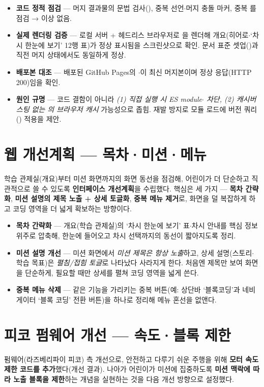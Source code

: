 \begin{itemize}
  \item \textbf{코드 정적 점검} — 머지 결과물의 문법 검사(), 중복
  선언$\cdot$머지 충돌 마커, 중복 를 점검 → 이상 없음.
  \item \textbf{실제 렌더링 검증} — 로컬 서버 + 헤드리스 브라우저로 을
  렌더해 개요(히어로$\cdot$‘차시 한눈에 보기’ 12행 표)가 정상 표시됨을 스크린샷으로 확인.
  문서 표준 셋업()과 직전 머지 상태에서도 동일하게 정상.
  \item \textbf{배포본 대조} — 배포된 GitHub Pages의 $\cdot$이
  최신 머지본이며 정상 응답(HTTP 200)임을 확인.
  \item \textbf{원인 규명} — 코드 결함이 아니라 \emph{(1)  직접 실행 시
  ES module$\cdot$ 차단, (2) 캐시버스팅 없는 의 브라우저 캐시}
  가능성으로 좁힘. 재발 방지로 모듈 로드에 버전 쿼리() 적용을 제안.
\end{itemize}

\section{웹 개선계획 — 목차·미션·메뉴}
학습 관제실(개요)부터 미션 화면까지의 화면 동선을 점검해, 어린이가 더 단순하고
직관적으로 쓸 수 있도록 \textbf{인터페이스 개선계획}을 수립했다. 핵심은 세 가지 ---
\textbf{목차 간략화}, \textbf{미션 설명의 제목 노출 + 상세 토글화}, \textbf{중복 메뉴 제거}로,
화면을 덜 복잡하게 하고 코딩 영역을 더 넓게 확보하는 방향이다.

\begin{itemize}
  \item \textbf{목차 간략화} — 개요(학습 관제실)의 ‘차시 한눈에 보기’ 표$\cdot$차시 안내를
  핵심 정보 위주로 압축해, 한눈에 들어오고 차시 선택까지의 동선이 짧아지도록 정리.
  \item \textbf{미션 설명 개선} — 미션 화면에서 \emph{미션 제목은 항상 노출}하고, 상세
  설명(스토리$\cdot$학습 목표)은 \emph{펼침/접힘 토글}로 나타났다 사라지게 한다. 처음엔
  제목만 보여 화면을 단순하게, 필요할 때만 상세를 펼쳐 코딩 영역을 넓게 쓴다.
  \item \textbf{중복 메뉴 삭제} — 같은 기능을 가리키는 중복 버튼(예: 상단바 ‘블록코딩’과
  네비게이터 ‘블록 코딩’ 전환 버튼)을 하나로 정리해 메뉴 혼선을 없앤다.
\end{itemize}

\section{피코 펌웨어 개선 — 속도·블록 제한}
펌웨어(라즈베리파이 피코) 측 개선으로, 안전하고 다루기 쉬운 주행을 위해 \textbf{모터
속도 제한 코드를 추가}했다(개선 결과). 나아가 어린이가 미션에 집중하도록 \textbf{미션
맥락에 따라 노출 블록을 제한}하는 개념을 실현하는 것을 다음 개선 방향으로 설정했다.

